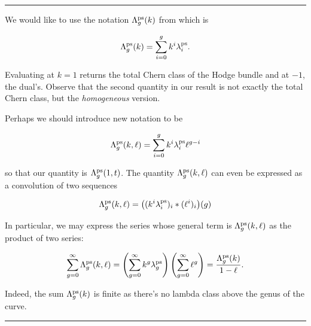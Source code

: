 \documentclass[12pt]{memoir}
\begin{document}
\hrule

\begin{Rmk}\label{rmk-new-notn-hom-lambda}
    We would like to use the notation \(\Lambda_g^{\operatorname{\mathrm{ps}}}(k)\) from \cite{MattAndRenzo} which is

    \[\Lambda_g^{\operatorname{\mathrm{ps}}}(k)=\sum_{i=0}^{g}k^i\lambda_i^{\operatorname{\mathrm{ps}}}.\]

    Evaluating at \(k=1\) returns the total Chern class of the Hodge bundle and at \(-1\), the dual's. Observe that the second quantity in our result is not exactly the total Chern class, but the \emph{homogeneous} version.\par
    Perhaps we should introduce new notation to be

    \[\Lambda_g^{\operatorname{\mathrm{ps}}}(k,\ell)=\sum_{i=0}^{g}k^i\lambda_i^{\operatorname{\mathrm{ps}}}\ell^{g-i}\]

    so that our quantity is \(\Lambda_g^{\operatorname{\mathrm{ps}}}(1,t)\). The quantity \(\Lambda_g^{\operatorname{\mathrm{ps}}}(k,\ell)\) can even be expressed as a convolution of two sequences


    \[\Lambda_g^{\operatorname{\mathrm{ps}}}(k,\ell)= \bigl((k^i\lambda_i^{\operatorname{\mathrm{ps}}})_i\ast(\ell^i)_i\bigr)(g)
    \]


    In particular, we may express the series whose general term is \(\Lambda_g^{\operatorname{\mathrm{ps}}}(k,\ell)\) as the product of two series:

    \[\sum_{g=0}^{\infty}\Lambda_g^{\operatorname{\mathrm{ps}}}(k,\ell)=\left(\sum_{g=0}^{\infty}k^g\lambda_g^{\operatorname{\mathrm{ps}}}\right)\left(\sum_{g=0}^{\infty}\ell^g\right)=\frac{\Lambda_g^{\operatorname{\mathrm{ps}}}(k)}{1-\ell}.
    \]

    Indeed, the sum \(\Lambda_g^{\operatorname{\mathrm{ps}}}(k)\) is finite as there's no lambda class above the genus of the curve.
\end{Rmk}

\hrule
\end{document}
